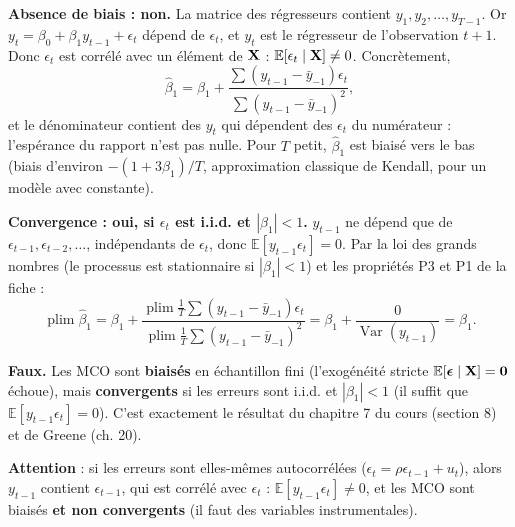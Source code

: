 \documentclass[11pt,a4paper]{article}
\newcommand{\E}{\mathbb{E}}\newcommand{\Var}{\operatorname{Var}}\newcommand{\Cov}{\operatorname{Cov}}
\newcommand{\plim}{\operatorname{plim}}
\begin{document}
\textbf{Absence de biais : non.} La matrice des régresseurs contient $y_1,y_2,\dots,y_{T-1}$. Or $y_t=\beta_0+\beta_1y_{t-1}+\epsilon_t$ dépend de $\epsilon_t$, et $y_t$ est le régresseur de l'observation $t+1$. Donc $\epsilon_t$ est corrélé avec un élément de $\mathbf{X}$ : $\E[\epsilon_t\mid\vX]\neq0$. Concrètement,
\[
\hat\beta_1=\beta_1+\frac{\sum(y_{t-1}-\bar y_{-1})\epsilon_t}{\sum(y_{t-1}-\bar y_{-1})^2},
\]
et le dénominateur contient des $y_t$ qui dépendent des $\epsilon_t$ du numérateur : l'espérance du rapport n'est pas nulle. Pour $T$ petit, $\hat\beta_1$ est biaisé vers le bas (biais d'environ $-(1+3\beta_1)/T$, approximation classique de Kendall, pour un modèle avec constante).

\textbf{Convergence : oui, si $\epsilon_t$ est i.i.d. et $|\beta_1|<1$.} $y_{t-1}$ ne dépend que de $\epsilon_{t-1},\epsilon_{t-2},\dots$, indépendants de $\epsilon_t$, donc $\E[y_{t-1}\epsilon_t]=0$. Par la loi des grands nombres (le processus est stationnaire si $|\beta_1|<1$) et les propriétés P3 et P1 de la fiche :
\[
\plim\hat\beta_1=\beta_1+\frac{\plim\frac1T\sum(y_{t-1}-\bar y_{-1})\epsilon_t}{\plim\frac1T\sum(y_{t-1}-\bar y_{-1})^2}=\beta_1+\frac{0}{\Var(y_{t-1})}=\beta_1 .
\]

\begin{reponse}
\textbf{Faux.} Les MCO sont \textbf{biaisés} en échantillon fini (l'exogénéité stricte $\E[\veps\mid\vX]=\mathbf 0$ échoue), mais \textbf{convergents} si les erreurs sont i.i.d. et $|\beta_1|<1$ (il suffit que $\E[y_{t-1}\epsilon_t]=0$). C'est exactement le résultat du chapitre 7 du cours (section 8) et de Greene (ch. 20).

\textbf{Attention} : si les erreurs sont elles-mêmes autocorrélées ($\epsilon_t=\rho\epsilon_{t-1}+u_t$), alors $y_{t-1}$ contient $\epsilon_{t-1}$, qui est corrélé avec $\epsilon_t$ : $\E[y_{t-1}\epsilon_t]\neq0$, et les MCO sont biaisés \textbf{et non convergents} (il faut des variables instrumentales).
\end{reponse}
\end{document}
